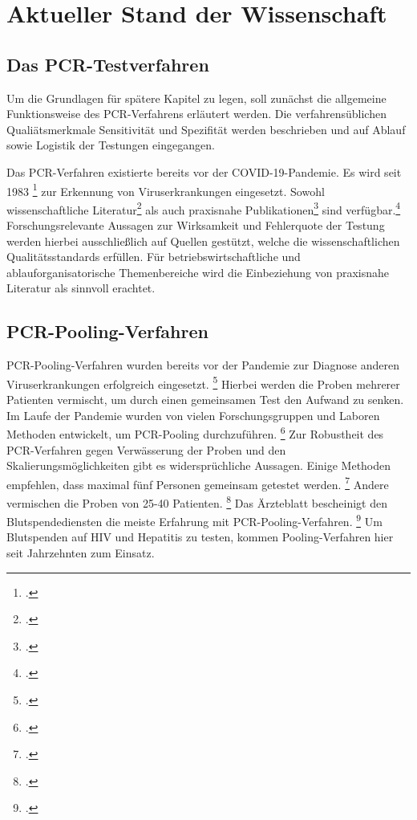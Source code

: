 
\chapter{Aktueller Stand der Wissenschaft}
\section{Das PCR-Testverfahren}
Um die Grundlagen für spätere Kapitel zu legen, soll zunächst die allgemeine Funktionsweise des PCR-Verfahrens erläutert werden.
Die verfahrensüblichen Qualiätsmerkmale Sensitivität und Spezifität werden beschrieben und auf Ablauf sowie Logistik der Testungen eingegangen.

Das PCR-Verfahren existierte bereits vor der COVID-19-Pandemie.
Es wird seit 1983
\footcite{wink_pcr_1994}
zur Erkennung von Viruserkrankungen eingesetzt.
Sowohl wissenschaftliche Literatur\footcite{schmidt_novel_2020}
als auch praxisnahe Publikationen\footcite{wehrle_weber_pcr_1994}
sind verfügbar.\footcite{clewley_polymerase_1995}
Forschungsrelevante Aussagen zur Wirksamkeit und Fehlerquote der Testung werden hierbei ausschließlich auf Quellen gestützt, welche die wissenschaftlichen Qualitätsstandards erfüllen.
Für betriebswirtschaftliche und ablauforganisatorische Themenbereiche wird die Einbeziehung von praxisnahe Literatur als sinnvoll erachtet.

\section{PCR-Pooling-Verfahren}
PCR-Pooling-Verfahren wurden bereits vor der Pandemie zur Diagnose anderen Viruserkrankungen erfolgreich eingesetzt.
\footcite{Aertzeblatt}
Hierbei werden die Proben mehrerer Patienten vermischt, um durch einen gemeinsamen Test den Aufwand zu senken.
Im Laufe der Pandemie wurden von vielen Forschungsgruppen und Laboren Methoden entwickelt, um PCR-Pooling durchzuführen.
\footcite{calabrese_how_2021}
Zur Robustheit des PCR-Verfahren gegen Verwässerung der Proben und den Skalierungsmöglichkeiten gibt es widersprüchliche Aussagen.
Einige Methoden empfehlen, dass maximal fünf Personen gemeinsam getestet werden.
\footcite{schmidt_novel_2020}
Andere vermischen die Proben von 25-40 Patienten.
\footcite{verwilt_evaluation_2021}
Das Ärzteblatt bescheinigt den Blutspendediensten die meiste Erfahrung mit PCR-Pooling-Verfahren.
\footcite{Aertzeblatt}
Um Blutspenden auf HIV und Hepatitis zu testen, kommen Pooling-Verfahren hier seit Jahrzehnten zum Einsatz.

